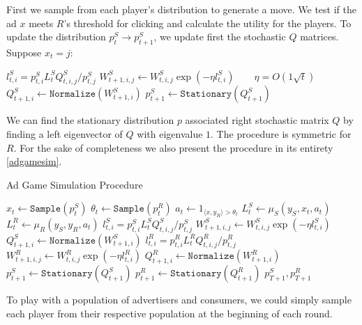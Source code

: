 \documentclass{article}
\begin{document}
First we sample from each player's distribution to generate a move. We test if the ad $x$ meets $R$'s threshold for clicking and calculate the utility for the players. To update the distribution $p_{t}^S\rightarrow p_{t+1}^S$, we update first the stochastic $Q$ matrices. Suppose $x_t = j$:
\begin{algorithmic}
    \State $l_{t,i}^S = p_{t,i}^S L_t^S Q_{t,i,j}^S / p_{t,j}^S$
    \State $W_{t+1,i,j}^S \leftarrow W_{t,i,j}^S\exp(-\eta l_{t,i}^S) \quad\quad \eta = O(1\sqrt{t})$
    \State $Q_{t+1,i}^S \leftarrow \texttt{Normalize}(W_{t+1,i}^S)$
\EndFor
\State $p_{t+1}^S \leftarrow \texttt{Stationary}(Q_{t+1}^S)$
\end{algorithmic}
We can find the stationary distribution $p$ associated right stochastic matrix $Q$ by finding a left eigenvector of $Q$ with eigenvalue $1$. The procedure is symmetric for $R$. For the sake of completeness we also present the procedure in its entirety \autoref{adgamesim}.
\begin{algorithm}
\caption{Ad Game Simulation Procedure}
\label{adgamesim}
\begin{algorithmic}[1]
\EndFor
{}
\EndFor
    \State $x_t \leftarrow \texttt{Sample}(p_t^S)$
    \State $\theta_t \leftarrow \texttt{Sample}(p_t^R)$
    \State $a_t \leftarrow 1_{\langle x, y_R \rangle > \theta_t}$
    \State $L_t^S \leftarrow \mu_S(y_S,x_t,a_t)$
    \State $L_t^R \leftarrow \mu_R(y_S,y_R,a_t)$
        \State $l_{t,i}^S = p_{t,i}^S L_t^S Q_{t,i,j}^S / p_{t,j}^S$
        \State $W_{t+1,i,j}^S \leftarrow W_{t,i,j}^S\exp(-\eta l_{t,i}^S)$
        \State $Q_{t+1,i}^S \leftarrow \texttt{Normalize}(W_{t+1,i}^S)$
    \EndFor
        \State $l_{t,i}^R = p_{t,i}^R L_t^R Q_{t,i,j}^R / p_{t,j}^R$
        \State $W_{t+1,i,j}^R \leftarrow W_{t,i,j}^R\exp(-\eta l_{t,i}^R)$
        \State $Q_{t+1,i}^R \leftarrow \texttt{Normalize}(W_{t+1,i}^R)$
    \EndFor
    \State $p_{t+1}^S \leftarrow \texttt{Stationary}(Q_{t+1}^S)$
    \State $p_{t+1}^R \leftarrow \texttt{Stationary}(Q_{t+1}^R)$
\EndFor
\State \Return $p_{T+1}^S, p_{T+1}^R$
\end{algorithmic}
\end{algorithm}
To play with a population of advertisers and consumers, we could simply sample each player from their respective population at the beginning of each round.
\end{document}
